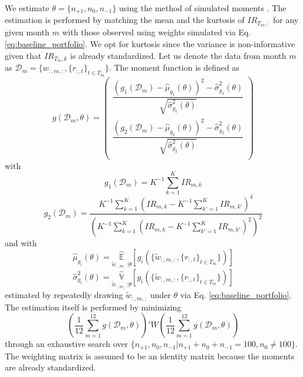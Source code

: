 \documentclass[3p,times,twocolumn]{elsarticle}
\begin{document}
We estimate $\theta=\{ n_{+1}, n_{0}, n_{-1}\}$ using the method of simulated moments \citep{mcfaddenMethodSimulatedMoments1989}.
The estimation is performed by matching the mean and the kurtosis of $IR_{T_{m},:}$ for any given month $m$ with those observed using weights simulated via Eq. \ref{eq:baseline_portfolio}.
We opt for kurtosis since the variance is non-informative given that $IR_{T_{m},k}$ is already standardized.
Let us denote the data from month $m$ as $\mathcal{D}_{m}=\{w_{:,m,:}, \{r_{:,t}\}_{t\in T_{m}}\}$.
The moment function is defined as
\begin{equation}
    g(\mathcal{D}_{m},\theta)=
    \begin{pmatrix}
        \dfrac{\left(g_{1}(\mathcal{D}_{m})- \hat{\mu}_{g_{1}}(\theta)\right)^2 - \hat{\sigma}^{2}_{g_{1}}(\theta)}{\sqrt{\hat{\sigma}^{2}_{g_{1}}(\theta)}} \\
        \dfrac{\left(g_{2}(\mathcal{D}_{m})- \hat{\mu}_{g_{2}}(\theta)\right)^2 - \hat{\sigma}^{2}_{g_{2}}(\theta)}{\sqrt{\hat{\sigma}^{2}_{g_{2}}(\theta)}} \\
    \end{pmatrix}
\end{equation}
with
\begin{equation}
    g_{1}(\mathcal{D}_{m}) = K^{-1}\sum_{k=1}^{K}IR_{m,k}
\end{equation}
\begin{equation}
    g_{2}(\mathcal{D}_{m}) = \frac{K^{-1}\sum_{k=1}^{K}(IR_{m,k}-K^{-1}\sum_{k'=1}^{K}IR_{m,k'})^{4}}{\left(K^{-1}\sum_{k=1}^{K}(IR_{m,k}-K^{-1}\sum_{k'=1}^{K}IR_{m,k'})^{2}\right)^{2}}
\end{equation}
and with
\begin{equation}
    \hat{\mu}_{g_{i}}(\theta)=\underset{\tilde{w}_{:,m,:}|\theta}{\widehat{\mathbb{E}}}[g_{i}(\{\tilde{w}_{:,m,:}, \{r_{:,t}\}_{t\in T_{m}}\})]
\end{equation}
\begin{equation}
    \hat{\sigma}_{g_{i}}^{2}(\theta)=\underset{\tilde{w}_{:,m,:}|\theta}{\widehat{\mathbb{V}}}[g_{i}(\{\tilde{w}_{:,m,:}, \{r_{:,t}\}_{t\in T_{m}}\})]
\end{equation}
estimated by repeatedly drawing $\tilde{w}_{:,m,:}$ under $\theta$ via Eq. \ref{eq:baseline_portfolio}.
The estimation itself is performed by minimizing
\begin{equation}
    \left(\dfrac{1}{12}\sum_{m=1}^{12}g(\mathcal{D}_{m},\theta)\right)' W \left(\dfrac{1}{12}\sum_{m=1}^{12}g(\mathcal{D}_{m},\theta)\right)
\end{equation}
through an exhaustive search over $\{n_{+1}, n_{0}, n_{-1}|n_{+1}+n_{0}+n_{-1}=100, n_{0} \neq 100\}$.
The weighting matrix is assumed to be an identity matrix because the moments are already standardized.
\end{document}
